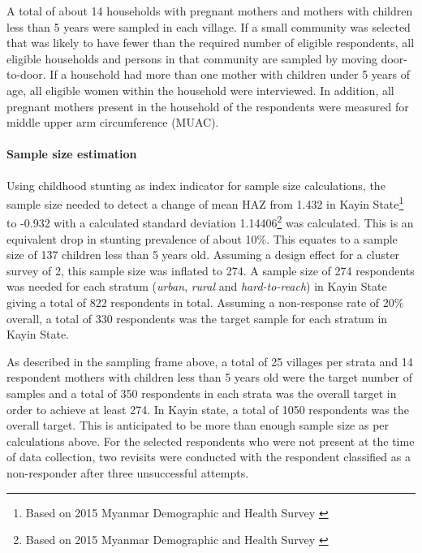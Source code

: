 \documentclass[12pt,a4paper]{article}
\let\oldparagraph\paragraph
\renewcommand{\paragraph}[1]{\oldparagraph{#1}\mbox{}}
\let\rmarkdownfootnote\footnote%
\def\footnote{\protect\rmarkdownfootnote}
\begin{document}
A total of about 14 households with pregnant mothers and mothers with children less than 5 years were sampled in each village. If a small community was selected that was likely to have fewer than the required number of eligible respondents, all eligible households and persons in that community are sampled by moving door-to-door. If a household had more than one mother with children under 5 years of age, all eligible women within the household were interviewed. In addition, all pregnant mothers present in the household of the respondents were measured for middle upper arm circumference (MUAC).

\hypertarget{sample-size-1}{%
\paragraph{Sample size estimation}\label{sample-size-1}}

Using childhood stunting as index indicator for sample size calculations, the sample size needed to detect a change of mean HAZ from 1.432 in Kayin State\footnote{Based on 2015 Myanmar Demographic and Health Survey \citep{MinistryofHealthandSports-MoHS/Myanmar2017}} to -0.932 with a calculated standard deviation 1.14406\footnote{Based on 2015 Myanmar Demographic and Health Survey \citep{MinistryofHealthandSports-MoHS/Myanmar2017}} was calculated. This is an equivalent drop in stunting prevalence of about 10\%. This equates to a sample size of 137 children less than 5 years old. Assuming a design effect for a cluster survey of 2, this sample size was inflated to 274. A sample size of 274 respondents was needed for each stratum (\emph{urban}, \emph{rural} and \emph{hard-to-reach}) in Kayin State giving a total of 822 respondents in total. Assuming a non-response rate of 20\% overall, a total of 330 respondents was the target sample for each stratum in Kayin State.

As described in the sampling frame above, a total of 25 villages per strata and 14 respondent mothers with children less than 5 years old were the target number of samples and a total of 350 respondents in each strata was the overall target in order to achieve at least 274. In Kayin state, a total of 1050 respondents was the overall target. This is anticipated to be more than enough sample size as per calculations above. For the selected respondents who were not present at the time of data collection, two revisits were conducted with the respondent classified as a non-responder after three unsuccessful attempts.
\end{document}
